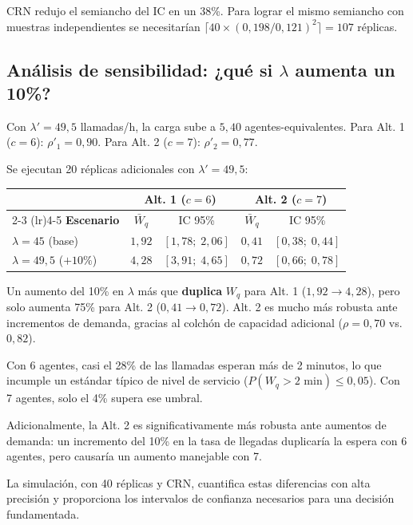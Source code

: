 \documentclass[11pt, letterpaper]{article}
\begin{document}
CRN redujo el semiancho del IC en un 38\%. Para lograr el mismo semiancho con muestras independientes se necesitarían $\lceil 40 \times (0{,}198/0{,}121)^2 \rceil = 107$ réplicas.

\subsection{Análisis de sensibilidad: ¿qué si $\lambda$ aumenta un 10\%?}

Con $\lambda' = 49{,}5$ llamadas/h, la carga sube a $5{,}40$ agentes-equivalentes. Para Alt. 1 ($c=6$): $\rho'_1 = 0{,}90$. Para Alt. 2 ($c=7$): $\rho'_2 = 0{,}77$.

Se ejecutan 20 réplicas adicionales con $\lambda' = 49{,}5$:

\begin{center}\small
\renewcommand{\arraystretch}{1.3}
\begin{tabular}{lcccc}
\toprule
 & \multicolumn{2}{c}{\textbf{Alt. 1 ($c=6$)}} & \multicolumn{2}{c}{\textbf{Alt. 2 ($c=7$)}} \\
\cmidrule(lr){2-3} \cmidrule(lr){4-5}
\textbf{Escenario} & $\bar W_q$ & IC 95\% & $\bar W_q$ & IC 95\% \\
\midrule
$\lambda = 45$ (base) & $1{,}92$ & $[1{,}78;\;2{,}06]$ & $0{,}41$ & $[0{,}38;\;0{,}44]$ \\
$\lambda = 49{,}5$ ($+10\%$) & $4{,}28$ & $[3{,}91;\;4{,}65]$ & $0{,}72$ & $[0{,}66;\;0{,}78]$ \\
\bottomrule
\end{tabular}
\end{center}

Un aumento del 10\% en $\lambda$ más que \textbf{duplica} $W_q$ para Alt. 1 ($1{,}92 \to 4{,}28$), pero solo aumenta 75\% para Alt. 2 ($0{,}41 \to 0{,}72$). Alt. 2 es mucho más robusta ante incrementos de demanda, gracias al colchón de capacidad adicional ($\rho = 0{,}70$ vs.\ $0{,}82$).

\begin{resultadobox}
Con 6 agentes, casi el 28\% de las llamadas esperan más de 2 minutos, lo que incumple un estándar típico de nivel de servicio ($P(W_q>2\text{ min})\le 0{,}05$). Con 7 agentes, solo el 4\% supera ese umbral.

Adicionalmente, la Alt. 2 es significativamente más robusta ante aumentos de demanda: un incremento del 10\% en la tasa de llegadas duplicaría la espera con 6 agentes, pero causaría un aumento manejable con 7.

La simulación, con 40 réplicas y CRN, cuantifica estas diferencias con alta precisión y proporciona los intervalos de confianza necesarios para una decisión fundamentada.
\end{resultadobox}
\end{document}
